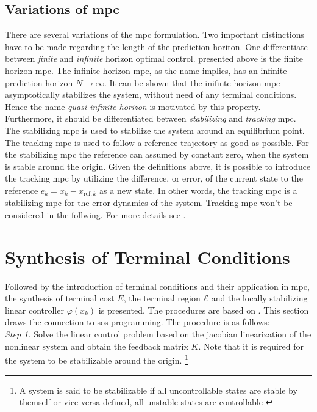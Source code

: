 \documentclass[10pt,a4paper]{article}
\begin{document}
\subsection{Variations of \gls{mpc}}
There are several variations of the \gls{mpc} formulation. Two important distinctions have to be made regarding the length
of the prediction horiton. One differentiate between \textit{finite} and \textit{infinite} horizon optimal control. presented
above is the finite horizon \gls{mpc}. The infinite horizon \gls{mpc}, as the name implies, has an infinite prediction horizon
$N \rightarrow \infty$. It can be shown that the inifinte horizon \gls{mpc} asymptotically stabilizes the system, without need
of any terminal conditions. Hence the name \textit{quasi-infinite horizon} is motivated by this property.
Furthermore, it should be differentiated between \textit{stabilizing} and \textit{tracking} \gls{mpc}. The stabilizing \gls{mpc}
is used to stabilize the system around an equilibrium point. The tracking \gls{mpc} is used to follow
a reference trajectory as good as possible. For the stabilizing \gls{mpc} the reference can assumed by constant zero, when the 
system is stable around the origin. Given the definitions above, it is possible to introduce the tracking \gls{mpc} by utilizing
the difference, or error, of the current state to the reference $e_k = x_k - x_{\text{ref},k}$ as a new state. In other words,
the tracking \gls{mpc} is a stabilizing \gls{mpc} for the error dynamics of the system. Tracking \gls{mpc} won't be considered in
the follwing. For more details see \cite{nmpcBible}. 










\section{Synthesis of Terminal Conditions}
\label{sec:synTermCond}
Followed by the introduction of terminal conditions and their application in \gls{mpc}, the synthesis of terminal cost $E$, the
terminal region $\mathcal{E}$ and the locally stabilizing linear controller $\varphi(x_{k})$ is presented. The procedures are based
on \cite{CHEN19981205}. This section draws the connection to \gls{sos} programming. The procedure is as follows:\\

\textit{Step 1.} Solve the linear control problem based on the jacobian linearization of the nonlinear system and obtain the feedback
matrix $K$. Note that it is required for the system to be stabilizable around the origin. \footnote{A system is said to be stabilizable if
all uncontrollable states are stable by themself or vice versa defined, all unstable states are controllable \cite{lunze2016regelungstechnik}}\\
\end{document}
